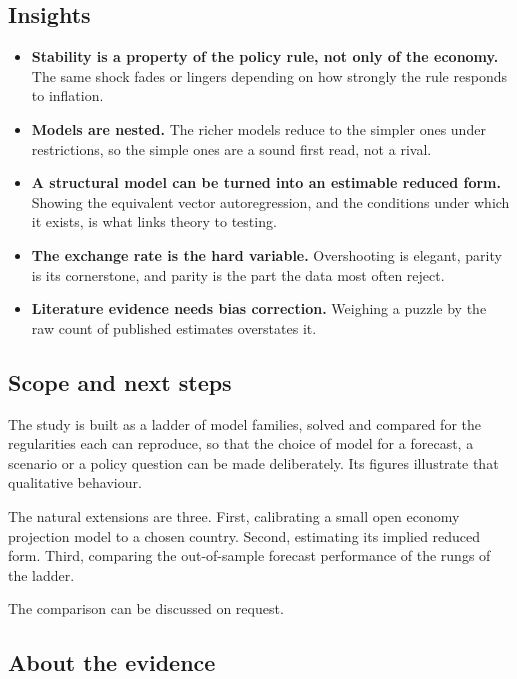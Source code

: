 \documentclass[
  british,
  a4paper,
]{article}
\providecommand{\tightlist}{%
  \setlength{\itemsep}{0pt}\setlength{\parskip}{0pt}}
\begin{document}
\subsection{Insights}\label{insights}

\begin{itemize}
\tightlist
\item
  \textbf{Stability is a property of the policy rule, not only of the
  economy.} The same shock fades or lingers depending on how strongly
  the rule responds to inflation.
\item
  \textbf{Models are nested.} The richer models reduce to the simpler
  ones under restrictions, so the simple ones are a sound first read,
  not a rival.
\item
  \textbf{A structural model can be turned into an estimable reduced
  form.} Showing the equivalent vector autoregression, and the
  conditions under which it exists, is what links theory to testing.
\item
  \textbf{The exchange rate is the hard variable.} Overshooting is
  elegant, parity is its cornerstone, and parity is the part the data
  most often reject.
\item
  \textbf{Literature evidence needs bias correction.} Weighing a puzzle
  by the raw count of published estimates overstates it.
\end{itemize}

\subsection{Scope and next steps}\label{scope-and-next-steps}

The study is built as a ladder of model families, solved and compared
for the regularities each can reproduce, so that the choice of model for
a forecast, a scenario or a policy question can be made deliberately.
Its figures illustrate that qualitative behaviour.

The natural extensions are three. First, calibrating a small open
economy projection model to a chosen country. Second, estimating its
implied reduced form. Third, comparing the out-of-sample forecast
performance of the rungs of the ladder.

The comparison can be discussed on request.

\subsection{About the evidence}\label{about-the-evidence}
\end{document}
